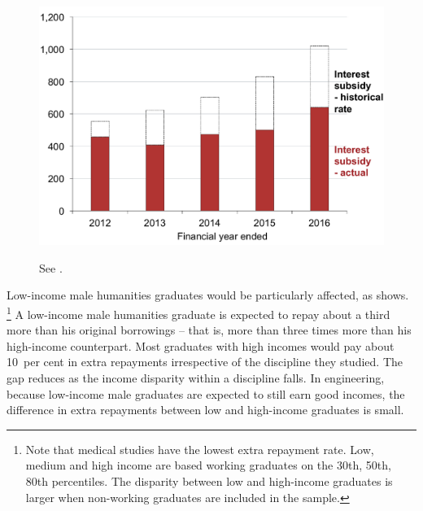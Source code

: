 \documentclass{grattan}
\begin{document}
\begin{figure}
\begin{minipage}[t][\textheight]{\columnwidth}

\includegraphics[page=15]{atlas/Chartpack.pdf}

{See .}
\end{minipage}
\end{figure}



Low-income male humanities graduates would be particularly affected, as  shows.%
   \footnote{Note that medical studies have the lowest extra repayment rate.
Low, medium and high income are based working graduates on the 30{th}, 50{th}, 80{th} percentiles.\label{fn:low-med-high-dfns}
The disparity between low and high-income graduates is larger when non-working graduates are included in the sample.} A low-income male humanities graduate is expected to repay about a third more than his original borrowings -- that is, more than three times more than his high-income counterpart. Most graduates with high incomes would pay about 10~per cent in extra repayments irrespective of the discipline they studied. The gap reduces as the income disparity within a discipline falls.
In engineering, because low-income male graduates are expected to still earn good incomes, the difference in extra repayments between low and high-income graduates is small.
\end{document}
